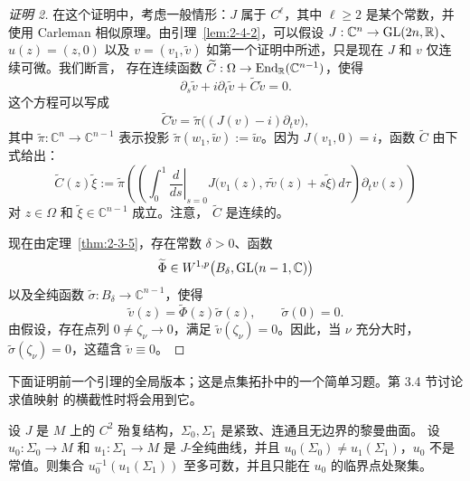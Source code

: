 \begin{proof}[证明 2]
在这个证明中，考虑一般情形：$J$ 属于 $C^\ell$，其中 $\ell\ge2$ 是某个常数，并使用
Carleman 相似原理。由引理~\ref{lem:2-4-2}，可以假设
$J:\mathbb C^n\to\operatorname{GL}(2n,\mathbb R)$、$u(z)=(z,0)$ 以及
$v=(v_1,\widetilde v)$ 如第一个证明中所述，只是现在 $J$ 和 $v$ 仅连续可微。我们断言，
存在连续函数
$\widetilde C:\Omega\to\operatorname{End}_{\mathbb R}(\mathbb C^{n-1})$，使得
\[
  \partial_s\widetilde v+i\partial_t\widetilde v
  +\widetilde C\widetilde v=0.
\]
这个方程可以写成
\[
  \widetilde C\widetilde v
  =\widetilde\pi\bigl((J(v)-i)\partial_tv\bigr),
\]
其中 $\widetilde\pi:\mathbb C^n\to\mathbb C^{n-1}$ 表示投影
$\widetilde\pi(w_1,\widetilde w):=\widetilde w$。因为 $J(v_1,0)=i$，函数
$\widetilde C$ 由下式给出：
\[
  \widetilde C(z)\widetilde\xi
  :=\widetilde\pi\left(
    \left(
      \int_0^1
      \left.\frac{d}{ds}\right|_{s=0}
      J\bigl(v_1(z),\tau\widetilde v(z)+s\widetilde\xi\bigr)\,d\tau
    \right)\partial_tv(z)
  \right)
\]
对 $z\in\Omega$ 和 $\widetilde\xi\in\mathbb C^{n-1}$ 成立。注意，
$\widetilde C$ 是连续的。

现在由定理~\ref{thm:2-3-5}，存在常数 $\delta>0$、函数
\[
  \widetilde\Phi\in W^{1,p}\bigl(B_\delta,\operatorname{GL}(n-1,\mathbb C)\bigr)
\]
以及全纯函数 $\widetilde\sigma:B_\delta\to\mathbb C^{n-1}$，使得
\[
  \widetilde v(z)=\widetilde\Phi(z)\widetilde\sigma(z),
  \qquad \widetilde\sigma(0)=0.
\]
由假设，存在点列 $0\ne\zeta_\nu\to0$，满足
$\widetilde v(\zeta_\nu)=0$。因此，当 $\nu$ 充分大时，
$\widetilde\sigma(\zeta_\nu)=0$，这蕴含 $\widetilde v\equiv0$。
\end{proof}

下面证明前一个引理的全局版本；这是点集拓扑中的一个简单习题。第 3.4 节讨论求值映射
的横截性时将会用到它。

\begin{proposition}\label{prop:2-4-4}
设 $J$ 是 $M$ 上的 $C^2$ 殆复结构，$\Sigma_0,\Sigma_1$ 是紧致、连通且无边界的黎曼曲面。
设 $u_0:\Sigma_0\to M$ 和 $u_1:\Sigma_1\to M$ 是 $J$-全纯曲线，并且
$u_0(\Sigma_0)\ne u_1(\Sigma_1)$，$u_0$ 不是常值。则集合
$u_0^{-1}(u_1(\Sigma_1))$ 至多可数，并且只能在 $u_0$ 的临界点处聚集。
\end{proposition}

